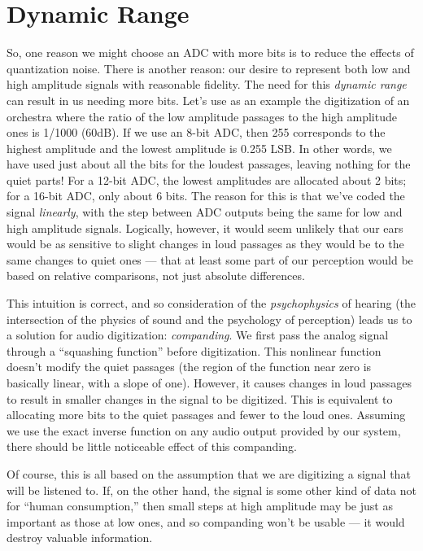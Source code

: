 \section{Dynamic Range}

So, one reason we might choose an ADC with more bits is to reduce the
effects of quantization noise.  There is another reason: our desire to
represent both low and high amplitude signals with reasonable
fidelity. The need for this \emph{dynamic range} can result in us
needing more bits.  Let's use as an example the digitization of an
orchestra where the ratio of the low amplitude passages to the high
amplitude ones is 1/1000 (60dB).  If we use an 8-bit ADC, then 255
corresponds to the highest amplitude and the lowest amplitude is 0.255
LSB. In other words, we have used just about all the bits for the
loudest passages, leaving nothing for the quiet parts!  For a 12-bit
ADC, the lowest amplitudes are allocated about 2 bits; for a 16-bit
ADC, only about 6 bits. The reason for this is that we've coded the
signal \emph{linearly}, with the step between ADC outputs being the
same for low and high amplitude signals. Logically, however, it would
seem unlikely that our ears would be as sensitive to slight changes in
loud passages as they would be to the same changes to quiet ones ---
that at least some part of our perception would be based on relative
comparisons, not just absolute differences.

This intuition is correct, and so consideration of the
\emph{psychophysics} of hearing (the intersection of the physics of
sound and the psychology of perception) leads us to a solution for
audio digitization: \emph{companding}. 
We first pass the analog signal through a ``squashing function''
before digitization. This nonlinear function doesn't modify the quiet
passages (the region of the function near zero is basically linear,
with a slope of one).  However, it causes changes in loud passages to
result in smaller changes in the signal to be digitized. This is
equivalent to allocating more bits to the quiet passages and fewer to
the loud ones. Assuming we use the exact inverse function on any audio
output provided by our system, there should be little noticeable
effect of this companding.

Of course, this is all based on the assumption that we are digitizing
a signal that will be listened to. If, on the other hand, the signal
is some other kind of data not for ``human consumption,'' then small
steps at high amplitude may be just as important as those at low ones,
and so companding won't be usable --- it would destroy valuable
information.

